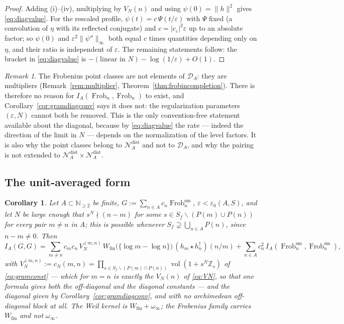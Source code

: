 \documentclass[11pt]{amsart}
\newtheorem{corollary}[theorem]{Corollary}
\theoremstyle{definition}
\theoremstyle{remark}
\newtheorem{remark}[theorem]{Remark}
\newcommand{\N}{\mathbb N}
\newcommand{\Z}{\mathbb Z}
\newcommand{\Frob}{\operatorname{Frob}}
\newcommand{\vol}{\operatorname{vol}}
\newcommand{\DA}{\mathcal D_A}
\newcommand{\Wfin}{W_{\mathrm{fin}}}
\begin{document}
\begin{proof}
Adding (i)--(iv), multiplying by $V_N(n)$ and using $\psi(0)=\|h\|^2$ gives
\eqref{eq:diagvalue}. For the rescaled profile, $\psi(t)=c\,\Psi(t/\varepsilon)$
with $\Psi$ fixed (a convolution of $\eta$ with its reflected conjugate) and
$c=|c_\varepsilon|^2\varepsilon$ up to an absolute factor; so $\psi(0)$ and
$\varepsilon^2\|\psi''\|_\infty$ both equal $c$ times quantities depending
only on $\eta$, and their ratio is independent of $\varepsilon$. The remaining
statements follow: the bracket in \eqref{eq:diagvalue} is
$-(\text{linear in }N)-\log(1/\varepsilon)+O(1)$.
\end{proof}

\begin{remark}\label{rem:nodiagonal}
The Frobenius point classes are not elements of $\DA$: they are multipliers
(Remark~\ref{rem:multiplier}, Theorem~\ref{thm:frobincompletion}). There is
therefore no reason for $I_A(\Frob_n,\Frob_n)$ to exist, and
Corollary~\ref{cor:gramdiagconv} says it does not: the regularization
parameters $(\varepsilon,N)$ cannot both be removed. This is the only
convention-free statement available about the diagonal, because by
\eqref{eq:diagvalue} the rate --- indeed the direction of the limit in $N$ ---
depends on the normalization of the level factors. It is also why the point
classes belong to $\mathcal N_A^{\mathrm{dist}}$ and not to $\DA$, and why the
pairing is not extended to $\mathcal N_A^{\mathrm{dist}}\times
\mathcal N_A^{\mathrm{dist}}$.
\end{remark}

\subsection{The unit-averaged form}

\begin{corollary}\label{cor:onlyfinite}
Let $A\subset\N_{\ge2}$ be finite, $G:=\sum_{n\in A}c_n\Frob_n^{\mathrm{sm}}$,
$\varepsilon<\varepsilon_0(A,S)$, and let $N$ be large enough that
$s^N\nmid(n-m)$ for some $s\in S_f\smallsetminus(P(m)\cup P(n))$ for every pair
$m\ne n$ in $A$; this is possible whenever
$S_f\supsetneq\bigcup_{n\in A}P(n)$, since $n-m\ne0$. Then
\begin{equation}\label{eq:gramtotal}
  I_A(G,G)=\sum_{m\ne n}c_mc_n\,V_N^{(m,n)}\,
    \Wfin\bigl(\{\log m-\log n\}\bigr)\,(h_m\star h_n^\dagger)(n/m)
   +\sum_{n\in A}c_n^2\,I_A(\Frob_n^{\mathrm{sm}},\Frob_n^{\mathrm{sm}}),
\end{equation}
with $V_N^{(m,n)}:=c_N(m,n)=\prod_{s\in S_f\smallsetminus(P(m)\cap P(n))}
\vol(1+s^N\Z_s)$ of \eqref{eq:gramconst} --- which for $m=n$ is exactly the
$V_N(n)$ of \eqref{eq:VN}, so that one formula gives both the off-diagonal and
the diagonal constants --- and the diagonal given by
Corollary~\ref{cor:gramdiagconv}, and with \emph{no archimedean off-diagonal
block at all}. The Weil kernel is $\Wfin+\omega_\infty$; the Frobenius family
carries $\Wfin$ and not $\omega_\infty$.
\end{corollary}
\end{document}
